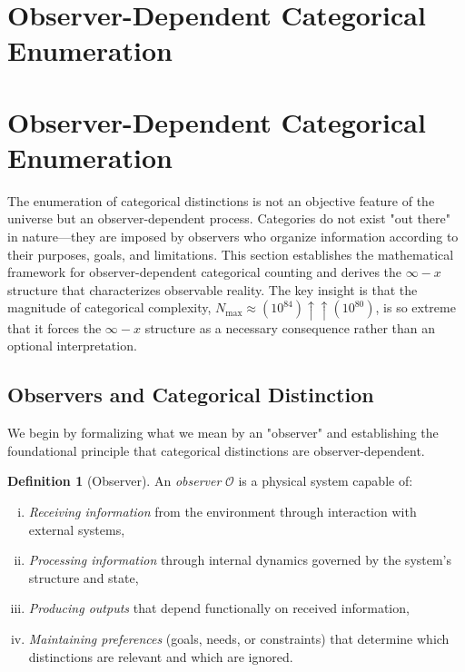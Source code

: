 \documentclass[12pt,a4paper]{article}
\theoremstyle{definition}
\newtheorem{definition}[theorem]{Definition}
\theoremstyle{remark}
\newcommand{\Nmax}{N_{\text{max}}}
\begin{document}
\section{Observer-Dependent Categorical Enumeration}
\label{sec:observer}
\section{Observer-Dependent Categorical Enumeration}
\label{sec:observer}

The enumeration of categorical distinctions is not an objective feature of the universe but an observer-dependent process. Categories do not exist "out there" in nature—they are imposed by observers who organize information according to their purposes, goals, and limitations. This section establishes the mathematical framework for observer-dependent categorical counting and derives the $\infty - x$ structure that characterizes observable reality. The key insight is that the magnitude of categorical complexity, $\Nmax \approx (10^{84}) \uparrow\uparrow (10^{80})$, is so extreme that it forces the $\infty - x$ structure as a necessary consequence rather than an optional interpretation.

\subsection{Observers and Categorical Distinction}

We begin by formalizing what we mean by an "observer" and establishing the foundational principle that categorical distinctions are observer-dependent.

\begin{definition}[Observer]
\label{def:observer}
An \emph{observer} $\mathcal{O}$ is a physical system capable of:
\begin{enumerate}[(i)]
    \item \emph{Receiving information} from the environment through interaction with external systems,
    \item \emph{Processing information} through internal dynamics governed by the system's structure and state,
    \item \emph{Producing outputs} that depend functionally on received information,
    \item \emph{Maintaining preferences} (goals, needs, or constraints) that determine which distinctions are relevant and which are ignored.
\end{enumerate}
\end{definition}
\end{document}
